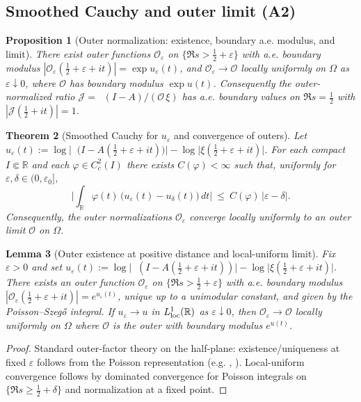 \documentclass[11pt]{article}
\newtheorem{theorem}{Theorem}
\newtheorem{proposition}[theorem]{Proposition}
\newtheorem{lemma}[theorem]{Lemma}
\theoremstyle{definition}
\theoremstyle{remark}
\newcommand{\R}{\mathbb{R}}
\DeclareMathOperator{\dettwo}{det_2}
\begin{document}
\subsection*{Smoothed Cauchy and outer limit (A2)}
\begin{proposition}[Outer normalization: existence, boundary a.e. modulus, and limit]\label{prop:outer-central}
There exist outer functions $\mathcal O_\varepsilon$ on $\{\Re s>\tfrac12+\varepsilon\}$ with a.e. boundary modulus $|\mathcal O_\varepsilon(\tfrac12+\varepsilon+it)|=\exp u_\varepsilon(t)$, and $\mathcal O_\varepsilon\to\mathcal O$ locally uniformly on $\Omega$ as $\varepsilon\downarrow 0$, where $\mathcal O$ has boundary modulus $\exp u(t)$. Consequently the outer-normalized ratio $\mathcal J=\dettwo(I-A)/(\mathcal O\,\xi)$ has a.e. boundary values on $\Re s=\tfrac12$ with $|\mathcal J(\tfrac12+it)|=1$.
\end{proposition}
\begin{theorem}[Smoothed Cauchy for $u_\varepsilon$ and convergence of outers]\label{thm:unsmoothed-Cauchy}
Let $u_\varepsilon(t):=\log\Big|\dettwo\!\big(I\! -\!A(\tfrac12\!+\varepsilon\!+\!it)\big)\Big|\! -\!\log\big|\xi(\tfrac12\!+\varepsilon\!+\!it)\big|$. For each compact $I\Subset\R$ and each $\varphi\in C_c^2(I)$ there exists $C(\varphi)<\infty$ such that, uniformly for $\varepsilon,\delta\in(0,\varepsilon_0]$,
\[
  \Big|\int_{\R} \varphi(t)\,\big(u_\varepsilon(t)-u_\delta(t)\big)\,dt\Big|\ \le\ C(\varphi)\,|\varepsilon-\delta|.
\]
Consequently, the outer normalizations $\mathcal O_\varepsilon$ converge locally uniformly to an outer limit $\mathcal O$ on $\Omega$.
\end{theorem}
\begin{lemma}[Outer existence at positive distance and local-uniform limit]\label{lem:outer-existence-limit}
Fix $\varepsilon>0$ and set $u_\varepsilon(t):=\log\big|\dettwo(I-A(\tfrac12+\varepsilon+it))\big|-\log\big|\xi(\tfrac12+\varepsilon+it)\big|$. There exists an outer function $\mathcal O_\varepsilon$ on $\{\Re s>\tfrac12+\varepsilon\}$ with a.e. boundary modulus $|\mathcal O_\varepsilon(\tfrac12+\varepsilon+it)|=e^{u_\varepsilon(t)}$, unique up to a unimodular constant, and given by the Poisson--Szeg\H{o} integral. If $u_\varepsilon\to u$ in $L^1_{\rm loc}(\R)$ as $\varepsilon\downarrow 0$, then $\mathcal O_\varepsilon\to \mathcal O$ locally uniformly on $\Omega$ where $\mathcal O$ is the outer with boundary modulus $e^{u(t)}$.
\end{lemma}
\begin{proof}
Standard outer-factor theory on the half-plane: existence/uniqueness at fixed $\varepsilon$ follows from the Poisson representation (e.g. \cite[Ch.~II]{Garnett}, \cite[Ch.~2]{RosenblumRovnyak}). Local-uniform convergence follows by dominated convergence for Poisson integrals on $\{\Re s\ge \tfrac12+\delta\}$ and normalization at a fixed point.
\end{proof}
\end{document}
